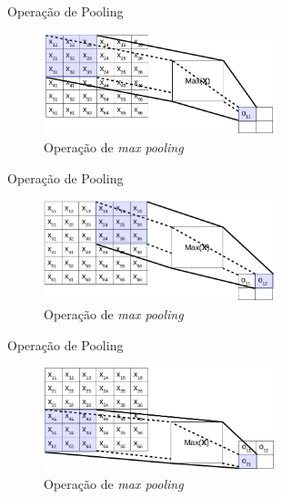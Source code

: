 \documentclass[%
  xcolor=table,%
  10pt,%
  aspectratio = 169,%
  compress,%
  t,%
]{beamer}%
\begin{document}
\begin{frame}{}{Operação de Pooling}
    \begin{figure}
        \centering
        \includegraphics[width=0.6\textwidth]{./Figuras/pool-op-1.png}
        \caption{Operação de \textit{max pooling}}
    \end{figure}
\end{frame}

\begin{frame}{}{Operação de Pooling}
    \begin{figure}
        \centering
        \includegraphics[width=0.6\textwidth]{./Figuras/pool-op-2.png}
        \caption{Operação de \textit{max pooling}}
    \end{figure}
\end{frame}

\begin{frame}{}{Operação de Pooling}
    \begin{figure}
        \centering
        \includegraphics[width=0.6\textwidth]{./Figuras/pool-op-3.png}
        \caption{Operação de \textit{max pooling}}
    \end{figure}
\end{frame}
\end{document}
